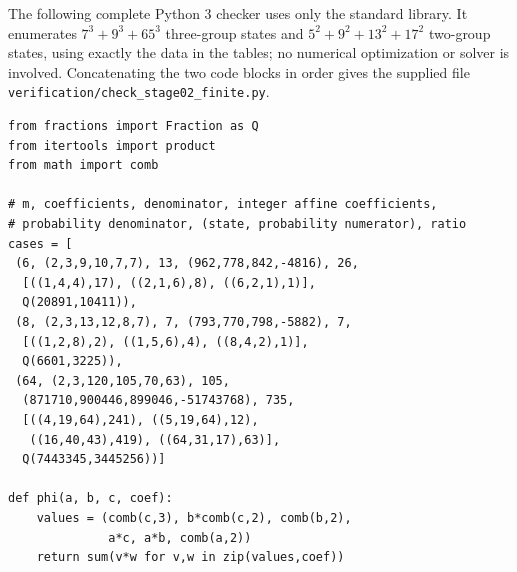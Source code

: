 \newpage
The following complete Python 3 checker uses only the standard library.
It enumerates $7^3+9^3+65^3$ three-group states and
$5^2+9^2+13^2+17^2$ two-group states, using exactly the data in the
tables; no numerical optimization or solver is involved. Concatenating
the two code blocks in order gives the supplied file
\texttt{verification/check\_stage02\_finite.py}.
\par\medskip\noindent\begin{minipage}{\textwidth}\small
\begin{verbatim}
from fractions import Fraction as Q
from itertools import product
from math import comb

# m, coefficients, denominator, integer affine coefficients,
# probability denominator, (state, probability numerator), ratio
cases = [
 (6, (2,3,9,10,7,7), 13, (962,778,842,-4816), 26,
  [((1,4,4),17), ((2,1,6),8), ((6,2,1),1)],
  Q(20891,10411)),
 (8, (2,3,13,12,8,7), 7, (793,770,798,-5882), 7,
  [((1,2,8),2), ((1,5,6),4), ((8,4,2),1)],
  Q(6601,3225)),
 (64, (2,3,120,105,70,63), 105,
  (871710,900446,899046,-51743768), 735,
  [((4,19,64),241), ((5,19,64),12),
   ((16,40,43),419), ((64,31,17),63)],
  Q(7443345,3445256))]

def phi(a, b, c, coef):
    values = (comb(c,3), b*comb(c,2), comb(b,2),
              a*c, a*b, comb(a,2))
    return sum(v*w for v,w in zip(values,coef))

\end{verbatim}
\end{minipage}
\newpage
